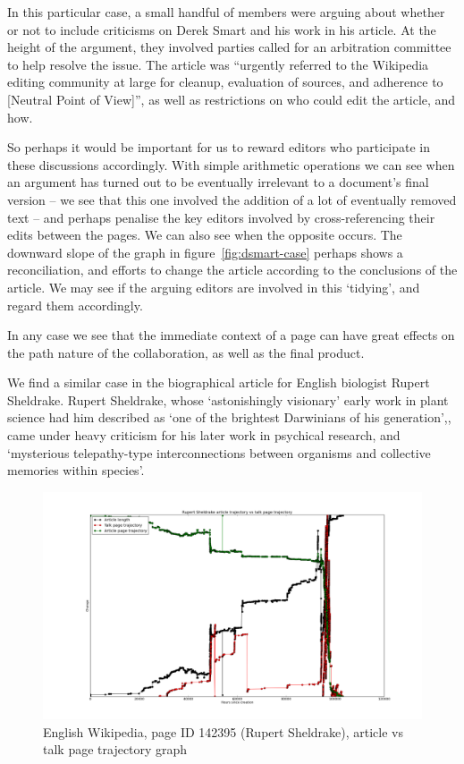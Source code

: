 In this particular case, a small handful of members were arguing about
whether or not to include criticisms on Derek Smart and his work in
his article. At the height of the argument, they involved parties
called for an arbitration committee to help resolve the issue. The
article was ``urgently referred to the Wikipedia editing community at
large for cleanup, evaluation of sources, and adherence to
[Neutral Point of View]'', as well as restrictions on who could edit
the article, and how.

So perhaps it would be important for us to reward editors who
participate in these discussions accordingly. With simple arithmetic
operations we can see when an argument has turned out to be eventually
irrelevant to a document's final version -- we see that this one
involved the addition of a lot of eventually removed text -- and
perhaps penalise the key editors involved by cross-referencing their
edits between the pages. We can also see when the opposite occurs. The
downward slope of the graph in figure~\ref{fig:dsmart-case}
perhaps shows a reconciliation, and efforts to change the article
according to the conclusions of the article. We may see if the arguing
editors are involved in this `tidying', and regard them accordingly.

In any case we see that the immediate context of a page can have great
effects on the path nature of the collaboration, as well as the final
product.

We find a similar case in the biographical article for English
biologist Rupert Sheldrake. Rupert Sheldrake, whose `astonishingly
visionary' early work in plant science had him described as `one of
the brightest Darwinians of his
generation',\cite{odyssey-auxin}\cite{guardian-shel}, came under heavy
criticism for his later work in psychical research, and `mysterious
telepathy-type interconnections between organisms and collective
memories within species'.\cite{sheldrake-biog}

\begin{figure}
  \centering
  \centering
  \includegraphics[width=\linewidth]{img/rsheldrake/RupertSheldrakecombo.png}
  \caption{English Wikipedia, page ID 142395 (Rupert Sheldrake),
    article vs talk page trajectory graph}
  \label{fig:sheldrake-plot}
\end{figure}

